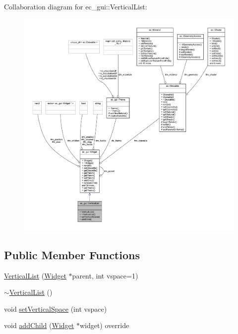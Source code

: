 Collaboration diagram for ec\+\_\+gui\+:\+:Vertical\+List\+:\nopagebreak
\begin{figure}[H]
\begin{center}
\leavevmode
\includegraphics[width=350pt]{classec__gui_1_1_vertical_list__coll__graph}
\end{center}
\end{figure}
\subsection*{Public Member Functions}
\begin{DoxyCompactItemize}
\item 
\mbox{\hyperlink{classec__gui_1_1_vertical_list_af7c9ad4079944e77219be0a3bf623278}{Vertical\+List}} (\mbox{\hyperlink{classec__gui_1_1_widget}{Widget}} $\ast$parent, int vspace=1)
\item 
\mbox{\hyperlink{classec__gui_1_1_vertical_list_acf95f2d95ebe84bcbaf7679093281241}{$\sim$\+Vertical\+List}} ()
\item 
void \mbox{\hyperlink{classec__gui_1_1_vertical_list_a34333087e3cf19a9b35ae2f80c635e87}{set\+Vertical\+Space}} (int vspace)
\item 
void \mbox{\hyperlink{classec__gui_1_1_vertical_list_aecea73019d3c1eb2edf95af5afef90d0}{add\+Child}} (\mbox{\hyperlink{classec__gui_1_1_widget}{Widget}} $\ast$widget) override
\end{DoxyCompactItemize}
